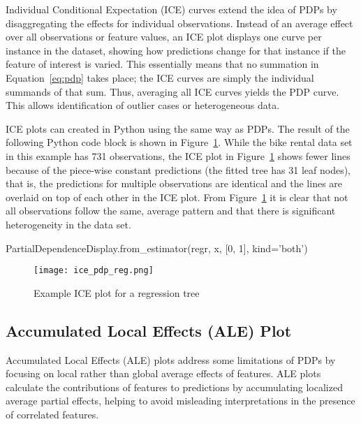 Individual Conditional Expectation (ICE) curves extend the idea of PDPs by disaggregating the effects for individual observations. Instead of an average effect over all observations or feature values, an ICE plot displays one curve per instance in the dataset, showing how predictions change for that instance if the feature of interest is varied. This essentially means that no summation in Equation~\ref{eq:pdp} takes place; the ICE curves are simply the individual summands of that sum. Thus, averaging all ICE curves yields the PDP curve. This allows identification of outlier cases or heterogeneous data. 

ICE plots can created in Python using the same way as PDPs. The result of the following Python code block is shown in Figure~\ref{fig:ice}. While the bike rental data set in this example has 731 observations, the ICE plot in Figure~\ref{fig:ice} shows fewer lines because of the piece-wise constant predictions (the fitted tree has 31 leaf nodes), that is, the predictions for multiple observations are identical and the lines are overlaid on top of each other in the ICE plot. From Figure~\ref{fig:ice} it is clear that not all observations follow the same, average pattern and that there is significant heterogeneity in the data set.

\begin{pythoncode}
PartialDependenceDisplay.from_estimator(regr, x, [0, 1], kind='both')
\end{pythoncode}

\begin{figure}
\centering

\texttt{[image: ice\_pdp\_reg.png]}
\caption{Example ICE plot for a regression tree}
\label{fig:ice}
\end{figure}


\subsection{Accumulated Local Effects (ALE) Plot}

Accumulated Local Effects (ALE) plots address some limitations of PDPs by focusing on local rather than global average effects of features. ALE plots calculate the contributions of features to predictions by accumulating localized average partial effects, helping to avoid misleading interpretations in the presence of correlated features. 

